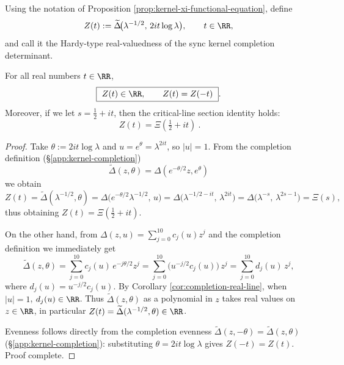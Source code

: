 \begin{definition}\label{def:kernel-hardy-function}
Using the notation of Proposition \ref{prop:kernel-xi-functional-equation}, define
$$
Z(t):=\widetilde{\Delta}\!\bigl(\lambda^{-1/2},\,2it\log\lambda\bigr),
\qquad t\in\RR,
$$
and call it the Hardy-type real-valuedness of the sync kernel completion determinant.
\end{definition}

\begin{proposition}\label{prop:kernel-hardy-real-even}
For all real numbers \(t\in\RR\),
$$
\boxed{\ Z(t)\in\RR,\qquad Z(t)=Z(-t)\ }.
$$
Moreover, if we let \(s=\tfrac12+it\), then the critical-line section identity holds:
$$
\boxed{\ Z(t)=\Xi\!\left(\tfrac12+it\right)\ }.
$$
\end{proposition}
\begin{proof}
Take \(\theta:=2it\log\lambda\) and \(u=e^\theta=\lambda^{2it}\), so \(|u|=1\).
From the completion definition (\S\ref{app:kernel-completion})
\[
\widetilde{\Delta}(z,\theta)=\Delta(e^{-\theta/2}z,e^\theta)
\]
we obtain
\[
Z(t)=\widetilde{\Delta}(\lambda^{-1/2},\theta)
=\Delta\!\bigl(e^{-\theta/2}\lambda^{-1/2},\,u\bigr)
=\Delta\!\bigl(\lambda^{-1/2-it},\,\lambda^{2it}\bigr)
=\Delta\!\bigl(\lambda^{-s},\,\lambda^{2s-1}\bigr)
=\Xi(s),
\]
thus obtaining \(Z(t)=\Xi(\tfrac12+it)\).
\par
On the other hand, from \(\Delta(z,u)=\sum_{j=0}^{10}c_j(u)z^j\) and the completion definition we immediately get
\[
\widetilde{\Delta}(z,\theta)=\sum_{j=0}^{10}c_j(u)\,e^{-j\theta/2}z^j
=\sum_{j=0}^{10}\bigl(u^{-j/2}c_j(u)\bigr)\,z^j
=\sum_{j=0}^{10}d_j(u)\,z^j,
\]
where \(d_j(u)=u^{-j/2}c_j(u)\).
By Corollary \ref{cor:completion-real-line}, when \(|u|=1\), \(d_j(u)\in\RR\).
Thus \(\widetilde{\Delta}(z,\theta)\) as a polynomial in \(z\) takes real values on \(z\in\RR\), in particular \(Z(t)=\widetilde{\Delta}(\lambda^{-1/2},\theta)\in\RR\).
\par
Evenness follows directly from the completion evenness \(\widetilde{\Delta}(z,-\theta)=\widetilde{\Delta}(z,\theta)\) (\S\ref{app:kernel-completion}): substituting \(\theta=2it\log\lambda\) gives \(Z(-t)=Z(t)\). Proof complete.
\end{proof}

